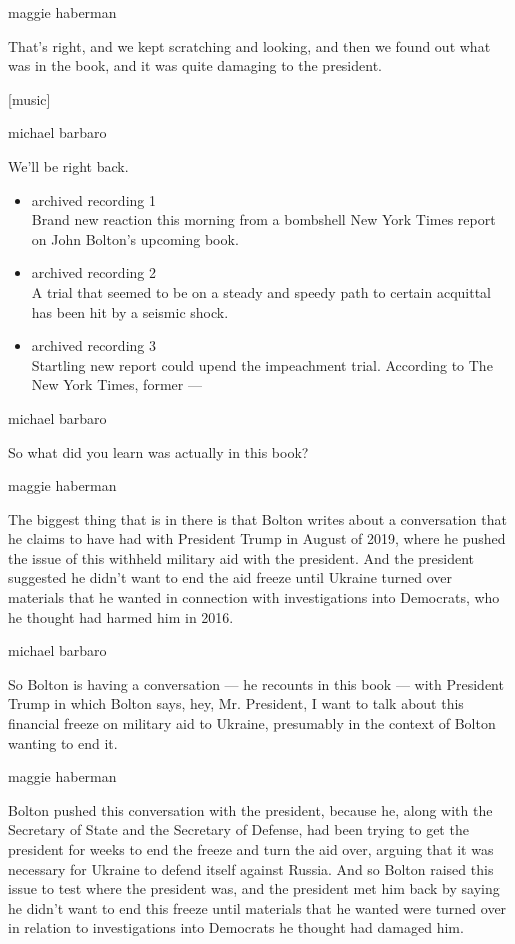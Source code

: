 maggie haberman

That's right, and we kept scratching and looking, and then we found out
what was in the book, and it was quite damaging to the president.

{[}music{]}

michael barbaro

We'll be right back.

\begin{itemize}
\item
  archived recording 1\\
  Brand new reaction this morning from a bombshell New York Times report
  on John Bolton's upcoming book.
\item
  archived recording 2\\
  A trial that seemed to be on a steady and speedy path to certain
  acquittal has been hit by a seismic shock.
\item
  archived recording 3\\
  Startling new report could upend the impeachment trial. According to
  The New York Times, former ---
\end{itemize}

michael barbaro

So what did you learn was actually in this book?

maggie haberman

The biggest thing that is in there is that Bolton writes about a
conversation that he claims to have had with President Trump in August
of 2019, where he pushed the issue of this withheld military aid with
the president. And the president suggested he didn't want to end the aid
freeze until Ukraine turned over materials that he wanted in connection
with investigations into Democrats, who he thought had harmed him in
2016.

michael barbaro

So Bolton is having a conversation --- he recounts in this book --- with
President Trump in which Bolton says, hey, Mr. President, I want to talk
about this financial freeze on military aid to Ukraine, presumably in
the context of Bolton wanting to end it.

maggie haberman

Bolton pushed this conversation with the president, because he, along
with the Secretary of State and the Secretary of Defense, had been
trying to get the president for weeks to end the freeze and turn the aid
over, arguing that it was necessary for Ukraine to defend itself against
Russia. And so Bolton raised this issue to test where the president was,
and the president met him back by saying he didn't want to end this
freeze until materials that he wanted were turned over in relation to
investigations into Democrats he thought had damaged him.

